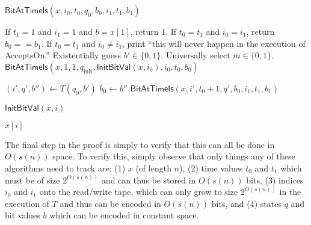 \documentclass{article}
\begin{document}
\begin{algorithm}{$\mathsf{BitAtTimeIs}(x, i_0, t_0, q_0, b_0, i_1, t_1, b_1)$}
\begin{algorithmic}
\STATE {}
\STATE If $t_1 = 1$ and $i_1 = 1$ and $b = x[1]$, return 1.
\STATE If $t_0 = t_1$ and $i_0 = i_1$, return $b_0 == b_1$.
\STATE If $t_0 = t_1$ and $i_0 \neq i_1$, print ``this will never happen in the execution of AcceptsOn.''
\STATE Existentially guess $b' \in \{0, 1\}$.
\STATE Universally select $m \in \{0, 1\}$.
\RETURN $\mathsf{BitAtTimeIs}(x, 1, 1, q_\text{init}, \mathsf{InitBitVal}(x, i_0), i_0, t_0, b_0)$  
\ELSE
\STATE {}

\STATE $(i', q', b'') \gets T(q_0, b')$ 
\STATE $b_0 \gets b''$
\ENDIF
\RETURN $\mathsf{BitAtTimeIs}(x, i', t_0 + 1, q', b_0, i_1, t_1, b_1)$
\ENDIF
\end{algorithmic}
\end{algorithm}

\begin{algorithm}{$\mathsf{InitBitVal}(x, i)$}
\begin{algorithmic}
\RETURN $x[i]$
\ELSE
{}
\ENDIF
\end{algorithmic}
\end{algorithm}

The final step in the proof is simply to verify that this can all be done in $O(s(n))$ space.
To verify this, simply observe that only things any of these algorithms need to track are: (1) $x$ (of length $n$), (2) time values $t_0$ and $t_1$ which must be of size $2^{O(s(n))}$ and can thus be stored in $O(s(n))$ bits, (3) indices $i_0$ and $i_1$ onto the read/write tape, which can only grow to size $2^{O(s(n))}$ in the execution of $T$ and thus can be encoded in $O(s(n))$ bits, and (4) states $q$ and bit values $b$ which can be encoded in constant space.

\end{document}
